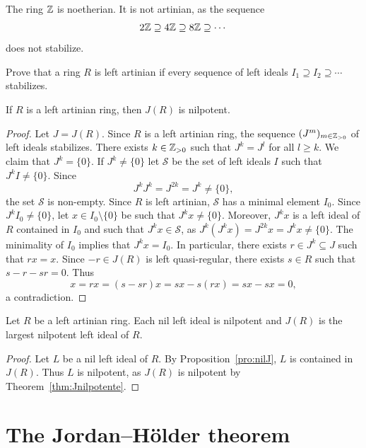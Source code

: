 \begin{example}
	The ring $\mathbb{Z}$ is noetherian. It is not artinian, as the sequence
	\[
	2\mathbb{Z}\supseteq
	4\mathbb{Z}\supseteq 8\mathbb{Z}\supseteq\cdots
	\]
	does not stabilize. 
\end{example}

\begin{exercise}
    Prove that a ring $R$ is left artinian if every sequence of 
    left ideals $I_1\supseteq I_2\supseteq\cdots$ stabilizes. 
\end{exercise}



\begin{theorem}
	\label{thm:Jnilpotente}
	If $R$ is a left artinian ring, then $J(R)$ is nilpotent. 
\end{theorem}

\begin{proof}
	Let $J=J(R)$. Since $R$ is a left artinian ring, the sequence 
	$(J^m)_{m\in\mathbb{Z}_{>0}}$ of left ideals stabilizes. There exists 
	$k\in\mathbb{Z}_{>0}$ such that $J^k=J^l$ for all $l\geq k$. We claim that $J^k=\{0\}$. If
	$J^k\ne\{0\}$ let $\mathcal{S}$ be the set of left ideals 
	$I$ such that $J^kI\ne\{0\}$. Since 
	\[
	J^kJ^k=J^{2k}=J^k\ne\{0\},
	\]
	the set $\mathcal{S}$ is non-empty. 
	Since $R$ is left artinian, $\mathcal{S}$ has a minimal element $I_0$. Since $J^kI_0\ne\{0\}$, let $x\in
	I_0\setminus\{0\}$ be such that $J^kx\ne\{0\}$. Moreover, $J^kx$ is a left ideal of $R$ 
	contained in $I_0$ and such that $J^kx\in\mathcal{S}$, as 
	$J^k(J^kx)=J^{2k}x=J^kx\ne\{0\}$. The minimality of $I_0$ implies that $J^kx=I_0$. In particular, 
	there exists $r\in J^k\subseteq J$ such that $rx=x$. Since $-r\in
	J(R)$ is left quasi-regular, there exists $s\in R$ such that $s-r-sr=0$.
	Thus 
	\[
		x=rx=(s-sr)x=sx-s(rx)=sx-sx=0,
	\]
	a contradiction.
\end{proof}

\begin{corollary}
	Let $R$ be a left artinian ring. Each nil left ideal is nilpotent and 
	$J(R)$ is the largest nilpotent left ideal of $R$. 
\end{corollary}

\begin{proof}
	Let $L$ be a nil left ideal of $R$. By Proposition~\ref{pro:nilJ}, $L$
	is contained in $J(R)$. Thus $L$ is nilpotent, as $J(R)$ 
	is nilpotent by Theorem~\ref{thm:Jnilpotente}. 
\end{proof}

\section{The Jordan--H\"older theorem}
\lecture\label{section:JordanHolder}


